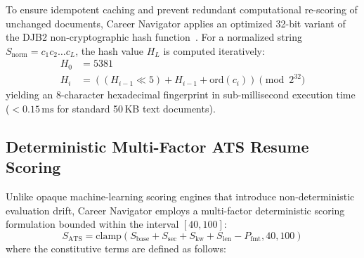 \documentclass[conference]{IEEEtran}
\begin{document}
To ensure idempotent caching and prevent redundant computational re-scoring of unchanged documents, Career Navigator applies an optimized 32-bit variant of the DJB2 non-cryptographic hash function~\cite{gupta2023high}. For a normalized string $S_{\mathrm{norm}} = c_1 c_2 \dots c_L$, the hash value $H_L$ is computed iteratively:
\begin{align}
    H_0 &= 5381 \\
    H_i &= \left( (H_{i-1} \ll 5) + H_{i-1} + \mathrm{ord}(c_i) \right) \pmod{2^{32}}
\end{align}
yielding an 8-character hexadecimal fingerprint in sub-millisecond execution time ($< 0.15\,\mathrm{ms}$ for standard 50\,KB text documents).

\subsection{Deterministic Multi-Factor ATS Resume Scoring}
Unlike opaque machine-learning scoring engines that introduce non-deterministic evaluation drift, Career Navigator employs a multi-factor deterministic scoring formulation bounded within the interval $[40, 100]$:
\begin{equation}
    S_{\mathrm{ATS}} = \mathrm{clamp}\left( S_{\mathrm{base}} + S_{\mathrm{sec}} + S_{\mathrm{kw}} + S_{\mathrm{len}} - P_{\mathrm{fmt}}, 40, 100 \right)
\end{equation}
where the constitutive terms are defined as follows:
\end{document}
